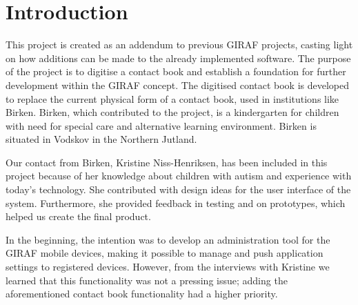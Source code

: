 \chapter{Introduction}


This project is created as an addendum to previous GIRAF projects, casting light on how additions can be made to the already implemented software.
The purpose of the project is to digitise a contact book and establish a foundation for further development within the GIRAF concept.
The digitised contact book is developed to replace the current physical form of a contact book, used in institutions like Birken.
Birken, which contributed to the project, is a kindergarten for children with need for special care and alternative learning environment. Birken is situated in Vodskov in the Northern Jutland.

Our contact from Birken, Kristine Niss-Henriksen, has been included in this project because of her knowledge about children with autism and experience with today's technology. She contributed with design ideas for the user interface of the system. Furthermore, she provided feedback in testing and on prototypes, which helped us create the final product.

In the beginning, the intention was to develop an administration tool for the GIRAF mobile devices, making it possible to manage and push application settings to registered devices. However, from the interviews with Kristine we learned that this functionality was not a pressing issue; adding the aforementioned contact book functionality had a higher priority.  

